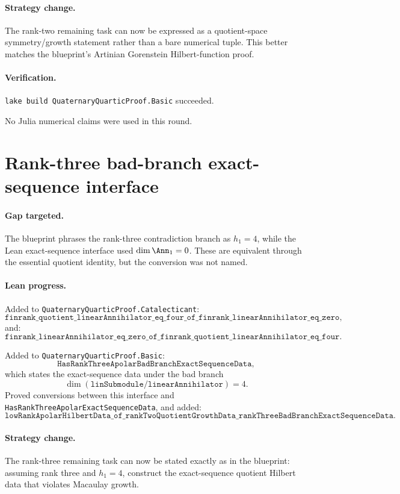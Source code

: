 \documentclass[11pt]{article}
\begin{document}
\paragraph{Strategy change.}
The rank-two remaining task can now be expressed as a quotient-space
symmetry/growth statement rather than a bare numerical tuple.  This better
matches the blueprint's Artinian Gorenstein Hilbert-function proof.

\paragraph{Verification.}
\texttt{lake build QuaternaryQuarticProof.Basic} succeeded.

No Julia numerical claims were used in this round.

\section*{Rank-three bad-branch exact-sequence interface}

\paragraph{Gap targeted.}
The blueprint phrases the rank-three contradiction branch as \(h_1=4\), while
the Lean exact-sequence interface used \(\dim\Ann_1=0\).  These are equivalent
through the essential quotient identity, but the conversion was not named.

\paragraph{Lean progress.}
Added to \texttt{QuaternaryQuarticProof.Catalecticant}:
\[
\texttt{finrank\_quotient\_linearAnnihilator\_eq\_four\_of\_finrank\_linearAnnihilator\_eq\_zero},
\]
and:
\[
\texttt{finrank\_linearAnnihilator\_eq\_zero\_of\_finrank\_quotient\_linearAnnihilator\_eq\_four}.
\]

Added to \texttt{QuaternaryQuarticProof.Basic}:
\[
\texttt{HasRankThreeApolarBadBranchExactSequenceData},
\]
which states the exact-sequence data under the bad branch
\[
\dim(\texttt{linSubmodule}/\texttt{linearAnnihilator})=4.
\]
Proved conversions between this interface and
\texttt{HasRankThreeApolarExactSequenceData}, and added:
\[
\texttt{lowRankApolarHilbertData\_of\_rankTwoQuotientGrowthData\_rankThreeBadBranchExactSequenceData}.
\]

\paragraph{Strategy change.}
The rank-three remaining task can now be stated exactly as in the blueprint:
assuming rank three and \(h_1=4\), construct the exact-sequence quotient
Hilbert data that violates Macaulay growth.
\end{document}
